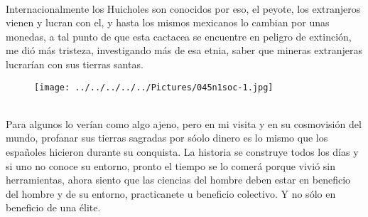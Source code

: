 \documentclass[10pt,a4paper]{article}
\begin{document}
\\
Internacionalmente los Huicholes son conocidos por eso, el peyote, los extranjeros vienen y lucran con el, y hasta los mismos mexicanos lo cambian por unas monedas, a tal punto de que esta cactacea se encuentre en peligro de extinci\'{o}n, me di\'{o} m\'{a}s tristeza, investigando m\'{a}s de esa etnia, saber que mineras extranjeras lucrar\'{i}an con sus tierras santas.
\\
\begin{figure}[hbtp]
\centering
\texttt{[image: ../../../../../Pictures/045n1soc-1.jpg]} 
\end{figure}
\\
Para algunos lo ver\'{i}an como algo ajeno, pero en mi visita y en su cosmovisi\'{o}n del mundo, profanar sus tierras sagradas por s\'{o}olo dinero es lo mismo que los espa\~{n}oles hicieron durante su conquista. La historia se construye todos los d\'{i}as y si uno no conoce su entorno, pronto el tiempo se lo comer\'{a} porque vivi\'{o} sin herramientas, ahora siento que las ciencias del hombre deben estar en beneficio del hombre y de su entorno, practicanete u beneficio colectivo. Y no s\'{o}lo en beneficio de una \'{e}lite. 
\end{document}

